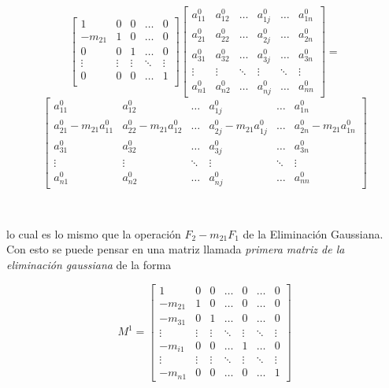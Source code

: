 \[
\begin{bmatrix}
1 & 0 & 0 & \ldots & 0 \\
-m_{21} & 1 & 0 & \ldots & 0 \\
0 & 0 & 1 & \ldots & 0 \\
\vdots & \vdots & \vdots & \ddots & \vdots \\
0 & 0 & 0 & \ldots & 1 \\
\end{bmatrix}
\begin{bmatrix}
a_{11}^{0} & a_{12}^{0} & \ldots & a_{1j}^{0} & \ldots &a_{1n}^{0} \\
a_{21}^{0} & a_{22}^{0} & \ldots & a_{2j}^{0} & \ldots &a_{2n}^{0} \\
a_{31}^{0} & a_{32}^{0} & \ldots & a_{3j}^{0} & \ldots &a_{3n}^{0} \\
\vdots & \vdots & \ddots & \vdots & \ddots & \vdots \\
a_{n1}^{0} & a_{n2}^{0} & \ldots & a_{nj}^{0} & \ldots &a_{nn}^{0}
\end{bmatrix}
=
\]
\[
\begin{bmatrix}
a_{11}^{0} & a_{12}^{0} & \ldots & a_{1j}^{0} & \ldots &a_{1n}^{0} \\
a_{21}^{0} -m_{21}a_{11}^{0} & a_{22}^{0}-m_{21}a_{12}^{0} & \ldots & a_{2j}^{0}-m_{21}a_{1j}^{0} & \ldots &a_{2n}^{0}-m_{21}a_{1n}^{0} \\
a_{31}^{0} & a_{32}^{0} & \ldots & a_{3j}^{0} & \ldots &a_{3n}^{0} \\
\vdots & \vdots & \ddots & \vdots & \ddots & \vdots \\
a_{n1}^{0} & a_{n2}^{0} & \ldots & a_{nj}^{0} & \ldots &a_{nn}^{0}
\end{bmatrix}
\]

\

lo cual es lo mismo que la operación $F_2 - m_{21}F_1$ de la Eliminación Gaussiana. Con esto se puede pensar en una matriz llamada \emph{primera matriz de la eliminación gaussiana} de la forma

\[
M^1 =
\begin{bmatrix}
1 & 0 & 0 & \ldots & 0 & \ldots & 0 \\
-m_{21} & 1 & 0 & \ldots & 0 & \ldots & 0 \\
-m_{31} & 0 & 1 & \ldots & 0 & \ldots & 0 \\
\vdots & \vdots & \vdots & \ddots & \vdots & \ddots & \vdots \\
-m_{i1} & 0 & 0 & \ldots & 1 & \ldots & 0 \\
\vdots & \vdots & \vdots & \ddots & \vdots & \ddots & \vdots \\
-m_{n1} & 0 & 0 & \ldots & 0 & \ldots & 1 
\end{bmatrix}
\]

